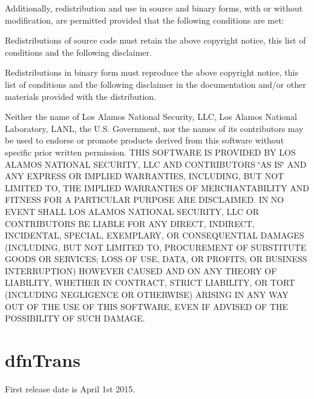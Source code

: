 Additionally, redistribution and use in source and binary forms, with or without modification, are permitted provided that the following conditions are met\+:
\begin{DoxyEnumerate}
\item Redistributions of source code must retain the above copyright notice, this list of conditions and the following disclaimer.
\item Redistributions in binary form must reproduce the above copyright notice, this list of conditions and the following disclaimer in the documentation and/or other materials provided with the distribution.
\item Neither the name of Los Alamos National Security, L\+LC, Los Alamos National Laboratory, L\+A\+NL, the U.\+S. Government, nor the names of its contributors may be used to endorse or promote products derived from this software without specific prior written permission. T\+H\+IS S\+O\+F\+T\+W\+A\+RE IS P\+R\+O\+V\+I\+D\+ED BY L\+OS A\+L\+A\+M\+OS N\+A\+T\+I\+O\+N\+AL S\+E\+C\+U\+R\+I\+TY, L\+LC A\+ND C\+O\+N\+T\+R\+I\+B\+U\+T\+O\+RS \char`\"{}\+A\+S I\+S\char`\"{} A\+ND A\+NY E\+X\+P\+R\+E\+SS OR I\+M\+P\+L\+I\+ED W\+A\+R\+R\+A\+N\+T\+I\+ES, I\+N\+C\+L\+U\+D\+I\+NG, B\+UT N\+OT L\+I\+M\+I\+T\+ED TO, T\+HE I\+M\+P\+L\+I\+ED W\+A\+R\+R\+A\+N\+T\+I\+ES OF M\+E\+R\+C\+H\+A\+N\+T\+A\+B\+I\+L\+I\+TY A\+ND F\+I\+T\+N\+E\+SS F\+OR A P\+A\+R\+T\+I\+C\+U\+L\+AR P\+U\+R\+P\+O\+SE A\+RE D\+I\+S\+C\+L\+A\+I\+M\+ED. IN NO E\+V\+E\+NT S\+H\+A\+LL L\+OS A\+L\+A\+M\+OS N\+A\+T\+I\+O\+N\+AL S\+E\+C\+U\+R\+I\+TY, L\+LC OR C\+O\+N\+T\+R\+I\+B\+U\+T\+O\+RS BE L\+I\+A\+B\+LE F\+OR A\+NY D\+I\+R\+E\+CT, I\+N\+D\+I\+R\+E\+CT, I\+N\+C\+I\+D\+E\+N\+T\+AL, S\+P\+E\+C\+I\+AL, E\+X\+E\+M\+P\+L\+A\+RY, OR C\+O\+N\+S\+E\+Q\+U\+E\+N\+T\+I\+AL D\+A\+M\+A\+G\+ES (I\+N\+C\+L\+U\+D\+I\+NG, B\+UT N\+OT L\+I\+M\+I\+T\+ED TO, P\+R\+O\+C\+U\+R\+E\+M\+E\+NT OF S\+U\+B\+S\+T\+I\+T\+U\+TE G\+O\+O\+DS OR S\+E\+R\+V\+I\+C\+ES; L\+O\+SS OF U\+SE, D\+A\+TA, OR P\+R\+O\+F\+I\+TS; OR B\+U\+S\+I\+N\+E\+SS I\+N\+T\+E\+R\+R\+U\+P\+T\+I\+ON) H\+O\+W\+E\+V\+ER C\+A\+U\+S\+ED A\+ND ON A\+NY T\+H\+E\+O\+RY OF L\+I\+A\+B\+I\+L\+I\+TY, W\+H\+E\+T\+H\+ER IN C\+O\+N\+T\+R\+A\+CT, S\+T\+R\+I\+CT L\+I\+A\+B\+I\+L\+I\+TY, OR T\+O\+RT (I\+N\+C\+L\+U\+D\+I\+NG N\+E\+G\+L\+I\+G\+E\+N\+CE OR O\+T\+H\+E\+R\+W\+I\+SE) A\+R\+I\+S\+I\+NG IN A\+NY W\+AY O\+UT OF T\+HE U\+SE OF T\+H\+IS S\+O\+F\+T\+W\+A\+RE, E\+V\+EN IF A\+D\+V\+I\+S\+ED OF T\+HE P\+O\+S\+S\+I\+B\+I\+L\+I\+TY OF S\+U\+CH D\+A\+M\+A\+GE.
\end{DoxyEnumerate}\hypertarget{index_dfnTrans}{}\section{dfn\+Trans}\label{index_dfnTrans}
First release date is April 1st 2015.

